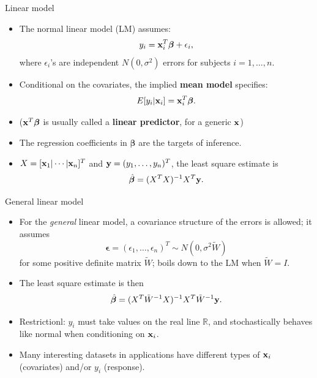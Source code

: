 \documentclass{beamer}
\newcommand{\boldbeta}{{\boldsymbol \beta}}
\newcommand{\boldx}{{\bf x}}
\newcommand{\bx}{{\bf x}}
\newenvironment{wideitemize}%
  {\begin{itemize}%
    \setlength{\parskip}{1em}}%
  {\end{itemize}}
\begin{document}
\begin{frame}{Linear model}
\begin{wideitemize}
%

\item 
The normal linear model (LM) assumes:
\begin{equation} \label{linReg}
y_i = \boldx_i^T\boldbeta + {\epsilon_i},
\end{equation}
where $\epsilon_i$'s are independent $N(0, \sigma^2)$ errors for subjects $i  =1, \dots, n$. 

\item Conditional on the covariates, the implied {\bf mean model} specifies: 
\[
E[y_i|\boldx_i] = \boldx_i^T\boldbeta.
\] 
 \item ($\boldx^T \boldbeta$ is usually called a  {\bf linear predictor}, for  a generic $\bx$)
 
\item The regression coefficients in $\boldbeta$ are the targets of inference. 

\item  $X =  [ \boldx_1| \cdots | \boldx_n]^T$ and ${\bf y} = (y_1, \dots, y_n)^T$, the least square estimate is 
\[\hat{\boldbeta} = (X^T X)^{-1} X^T{\bf y}.
\]
\end{wideitemize}
\end{frame}

\begin{frame} {General linear model	}
\begin{wideitemize}



\item For the \emph{general} linear model, a covariance structure of the errors is allowed; it assumes 
\[
{\boldsymbol \epsilon} = (\epsilon_1, \dots, \epsilon_n)^T \sim N(0, \sigma^2 \tilde{W})
\]
 for some positive definite matrix $ \tilde{W}$; boils down to the LM when $\tilde{W} = I$.

\item The least square estimate is then
\[\hat{\boldbeta} = (X^T  \tilde{W}^{-1} X)^{-1} X^T  \tilde{W}^{-1}{\bf y}.
\]

\item Restrictionl: $y_i$ must take values on the real line $\mathbb{R}$,  and stochastically behaves like normal when conditioning on $\boldx_i$. 

\item Many interesting datasets in applications  have different types of $\boldx_i$ (covariates) and/or $y_i$ (response). 


\end{wideitemize}


\end{frame}
\end{document}
